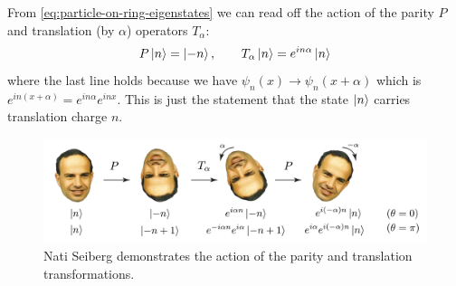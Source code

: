 \documentclass{report}
\begin{document}
From \cref{eq:particle-on-ring-eigenstates} we can read off the action of 
the parity $ P $ and translation (by $ \alpha $) operators $ T_\alpha $: 
\begin{equation*}
	P \ket{n} = \ket{-n},\qquad 
	T_\alpha\ket{n} = e^{in\alpha}\ket{n}
\end{equation*}
where the last line holds because we have $ \psi_n(x) \rightarrow \psi_n(x+ \alpha) $
which is $ e^{in(x+\alpha)} = e^{in\alpha}e^{inx} $. This is just the statement 
that the state $ \ket{n} $ carries translation charge $ n $. 

\begin{figure}[t]
	\centering
	\includegraphics[width=\textwidth]{figs/november/seiberg-thooft-anomaly-vector.pdf}
	\caption{Nati Seiberg demonstrates the action of the parity and translation 
	transformations.}
	\label{fig:particle-on-ring-seiberg}
\end{figure}
\end{document}
